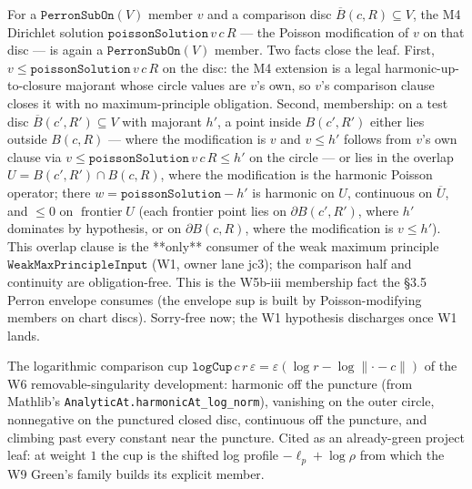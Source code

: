 \begin{lemma}
\label{lem:perron-sub-on-poisson-modify}
For a \(\texttt{PerronSubOn}(V)\) member \(v\) and a comparison disc
\(\overline{B}(c,R) \subseteq V\), the M4 Dirichlet solution
\(\texttt{poissonSolution}\,v\,c\,R\) — the Poisson modification of \(v\)
on that disc — is again a \(\texttt{PerronSubOn}(V)\) member.  Two facts
close the leaf.  First, \(v \le \texttt{poissonSolution}\,v\,c\,R\) on the
disc: the M4 extension is a legal harmonic-up-to-closure majorant whose
circle values are \(v\)'s own, so \(v\)'s comparison clause closes it with
no maximum-principle obligation.  Second, membership: on a test disc
\(\overline{B}(c',R') \subseteq V\) with majorant \(h'\), a point inside
\(B(c',R')\) either lies outside \(B(c,R)\) — where the modification is
\(v\) and \(v \le h'\) follows from \(v\)'s own clause via
\(v \le \texttt{poissonSolution}\,v\,c\,R \le h'\) on the circle — or lies
in the overlap \(U = B(c',R') \cap B(c,R)\), where the modification is the
harmonic Poisson operator; there \(w = \texttt{poissonSolution} - h'\) is
harmonic on \(U\), continuous on \(\overline{U}\), and \(\le 0\) on
\(\operatorname{frontier} U\) (each frontier point lies on
\(\partial B(c',R')\), where \(h'\) dominates by hypothesis, or on
\(\partial B(c,R)\), where the modification is \(v \le h'\)).  This overlap
clause is the **only** consumer of the weak maximum principle
\(\texttt{WeakMaxPrincipleInput}\) (W1, owner lane jc3); the comparison
half and continuity are obligation-free.  This is the W5b-iii membership
fact the §3.5 Perron envelope consumes (the envelope sup is built by
Poisson-modifying members on chart discs).  Sorry-free now; the W1
hypothesis discharges once W1 lands.
\leanok
\end{lemma}

\begin{lemma}
\label{lem:w6-log-cup}
The logarithmic comparison cup
\(\texttt{logCup}\,c\,r\,\varepsilon = \varepsilon(\log r - \log\lVert\cdot - c\rVert)\)
of the W6 removable-singularity development: harmonic off the puncture
(from Mathlib's \texttt{AnalyticAt.harmonicAt\_log\_norm}), vanishing on
the outer circle, nonnegative on the punctured closed disc, continuous
off the puncture, and climbing past every constant near the puncture.
Cited as an already-green project leaf: at weight \(1\) the cup is the
shifted log profile \(-\ell_p + \log\rho\) from which the W9 Green's
family builds its explicit member.
\leanok
\end{lemma}

